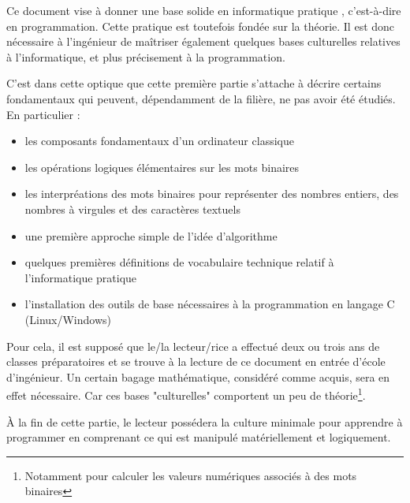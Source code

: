 \documentclass[../../main.tex]{subfiles}
\begin{document}
Ce document vise à donner une base solide en informatique \og pratique \fg{}, c'est-à-dire en programmation.
Cette pratique est toutefois fondée sur la théorie. Il est donc nécessaire à l'ingénieur de maîtriser
également quelques bases culturelles relatives à l'informatique, et plus précisement à la programmation.

C'est dans cette optique que cette première partie s'attache à décrire certains fondamentaux qui
peuvent, dépendamment de la filière, ne pas avoir été étudiés. En particulier :
\begin{itemize}
	\item les composants fondamentaux d'un ordinateur classique
	\item les opérations logiques élémentaires sur les mots binaires
	\item les interpréations des mots binaires pour représenter des nombres entiers, des nombres à virgules et des caractères textuels
	\item une première approche simple de l'idée d'algorithme
	\item quelques premières définitions de vocabulaire technique relatif à l'informatique pratique
	\item l'installation des outils de base nécessaires à la programmation en langage C (Linux/Windows)
\end{itemize}
Pour cela, il est supposé que le/la lecteur/rice a effectué deux ou trois ans de classes préparatoires et
se trouve à la lecture de ce document en entrée d'école d'ingénieur. Un certain bagage mathématique, considéré comme acquis, sera en effet nécessaire. Car ces bases "culturelles" comportent un peu de théorie\footnote{Notamment pour calculer les valeurs numériques associés à des mots binaires}.

À la fin de cette partie, le lecteur possédera la culture minimale pour apprendre à programmer en comprenant ce qui est manipulé matériellement et logiquement.

\hrulefill
\newpage
\end{document}
